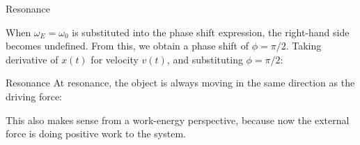 \documentclass[12pt,compress,aspectratio=169]{beamer}
\begin{document}
\begin{frame}{Resonance}

  When $\omega_E=\omega_0$ is substituted into the phase shift expression, the
  right-hand side becomes undefined. From this, we obtain a phase shift of
  $\phi=\pi/2$. Taking derivative of $x(t)$ for velocity $v(t)$, and
  substituting $\phi=\pi/2$:
  
\end{frame}



\begin{frame}{Resonance}
  At resonance, the object is always moving in the same direction as the
  driving force:

  \vspace{-.3in}{\large
    \begin{align*}
      v(t)&=A\omega_E\cos(\omega_E t)\\
      F_E(t)&=F\cos(\omega_E t)
    \end{align*}
  }

  \vspace{-.2in}This also makes sense from a work-energy perspective, because
  now the external force is doing positive work to the system.
\end{frame}
\end{document}
